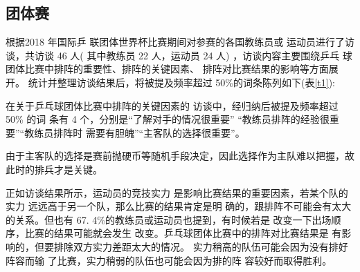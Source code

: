 \documentclass[a4paper,AutoFakeBold,AutoFakeSlant]{ctexart}
\begin{document}
\subsection{团体赛}
根据2018 年国际乒
联团体世界杯比赛期间对参赛的各国教练员或
运动员进行了访谈，共访谈 46 人( 其中教练员
22 人，运动员 24 人) ，访谈内容主要围绕乒乓
球团体比赛中排阵的重要性、排阵的关键因素、
排阵对比赛结果的影响等方面展开。\cite{张瑛秋2019东京奥运会乒乓球团体赛制改革背景下中国队夺金策略}
统计并整理访谈结果后，将被提及频率超过 50\%的词条陈列如下(表\ref{t1}):
\begin{table}[htbp]
  \begin{center}
  \caption{访谈结果——教练员与运动员对乒乓球团体比赛赛制的认识}
  \label{t1}
  \end{center}
  \end{table}

  在关于乒乓球团体比赛中排阵的关键因素的
访谈中，经归纳后被提及频率超过 50\% 的词
条有 4 个，分别是“了解对手的情况很重要”
“教练员排阵的经验很重要”“教练员排阵时
需要有胆魄”“主客队的选择很重要”。

由于主客队的选择是赛前抛硬币等随机手段决定，因此选择作为主队难以把握，故此时的排兵才是关键。

正如访谈结果所示，运动员的竞技实力
是影响比赛结果的重要因素，若某个队的实力
远远高于另一个队，那么比赛的结果肯定是明
确的，跟排阵不可能会有太大的关系。但也有
67. 4\%的教练员或运动员也提到，有时候若是
改变一下出场顺序，比赛的结果可能就会发生
改变。乒乓球团体比赛中的排阵对比赛结果是
有影响的，但要排除双方实力差距太大的情况。
实力稍高的队伍可能会因为没有排好阵容而输
了比赛，实力稍弱的队伍也可能会因为排的阵
容较好而取得胜利。
\end{document}

